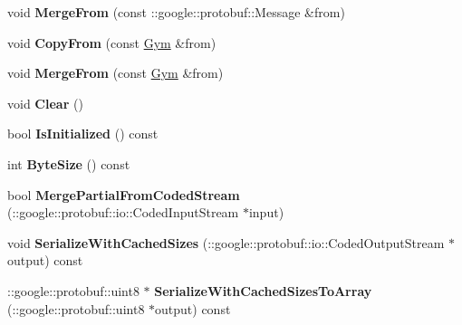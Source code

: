 \begin{DoxyCompactItemize}
\item 
\hypertarget{classexercise__protobuf_1_1_gym_afd460c91ffe194457fd04db10cb7bd8a}{}void {\bfseries Merge\+From} (const \+::google\+::protobuf\+::\+Message \&from)\label{classexercise__protobuf_1_1_gym_afd460c91ffe194457fd04db10cb7bd8a}

\item 
\hypertarget{classexercise__protobuf_1_1_gym_aba20cab66b8d8b8ba595dcee442be7b5}{}void {\bfseries Copy\+From} (const \hyperlink{classexercise__protobuf_1_1_gym}{Gym} \&from)\label{classexercise__protobuf_1_1_gym_aba20cab66b8d8b8ba595dcee442be7b5}

\item 
\hypertarget{classexercise__protobuf_1_1_gym_a73546f80d8e0922b723364bd3204919d}{}void {\bfseries Merge\+From} (const \hyperlink{classexercise__protobuf_1_1_gym}{Gym} \&from)\label{classexercise__protobuf_1_1_gym_a73546f80d8e0922b723364bd3204919d}

\item 
\hypertarget{classexercise__protobuf_1_1_gym_a852de6c227b4bbaf74f666d1837eec1a}{}void {\bfseries Clear} ()\label{classexercise__protobuf_1_1_gym_a852de6c227b4bbaf74f666d1837eec1a}

\item 
\hypertarget{classexercise__protobuf_1_1_gym_a79104f16342a99edf1141466cfebc8be}{}bool {\bfseries Is\+Initialized} () const \label{classexercise__protobuf_1_1_gym_a79104f16342a99edf1141466cfebc8be}

\item 
\hypertarget{classexercise__protobuf_1_1_gym_a886e7dab292a3d10f47d6d1891f72973}{}int {\bfseries Byte\+Size} () const \label{classexercise__protobuf_1_1_gym_a886e7dab292a3d10f47d6d1891f72973}

\item 
\hypertarget{classexercise__protobuf_1_1_gym_abc70c5b2303f2bd5fa41740d5f81a528}{}bool {\bfseries Merge\+Partial\+From\+Coded\+Stream} (\+::google\+::protobuf\+::io\+::\+Coded\+Input\+Stream $\ast$input)\label{classexercise__protobuf_1_1_gym_abc70c5b2303f2bd5fa41740d5f81a528}

\item 
\hypertarget{classexercise__protobuf_1_1_gym_a5f0ce954d508579596f36db637a0a130}{}void {\bfseries Serialize\+With\+Cached\+Sizes} (\+::google\+::protobuf\+::io\+::\+Coded\+Output\+Stream $\ast$output) const \label{classexercise__protobuf_1_1_gym_a5f0ce954d508579596f36db637a0a130}

\item 
\hypertarget{classexercise__protobuf_1_1_gym_a283d77c471e32f05d155112ecf2d1998}{}\+::google\+::protobuf\+::uint8 $\ast$ {\bfseries Serialize\+With\+Cached\+Sizes\+To\+Array} (\+::google\+::protobuf\+::uint8 $\ast$output) const \label{classexercise__protobuf_1_1_gym_a283d77c471e32f05d155112ecf2d1998}


\end{DoxyCompactItemize}
